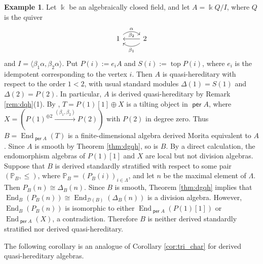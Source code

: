\documentclass[a4paper,reqno,11pt]{amsart}
\numberwithin{equation}{section}
\theoremstyle{definition}
\newtheorem{example}[theorem]{Example}
\newcommand{\D}{\mathcal{D}}
\newcommand{\PP}{\mathbb{P}}
\newcommand{\bde}{\Delta}
\newcommand{\kk}{\Bbbk}
\DeclareMathOperator{\per}{\mathsf{per}}
\DeclareMathOperator{\End}{End}
\begin{document}
\begin{example}\label{ex:rickard}
Let $\kk$ be an algebraically closed field, and let $A=\kk Q/I$, where $Q$ is the quiver
\[
\begin{tikzcd}
1 \arrow[r, bend left=40, "\alpha"] & 2 \arrow[l, bend left=40, "\beta_{1}"] \arrow[l, "\beta_{2}"']
\end{tikzcd}
\]
and $I=\langle\beta_{1}\alpha,\beta_{2}\alpha\rangle$.
Put $P(i):=e_{i}A$ and $S(i):=\operatorname{top}P(i)$, where $e_{i}$ is the idempotent corresponding to the vertex $i$.
Then $A$ is quasi-hereditary with respect to the order $1<2$, with usual standard modules $\Delta(1)=S(1)$ and $\Delta(2)=P(2)$.
In particular, $A$ is derived quasi-hereditary by Remark \ref{rem:dqh}(1).
By \cite{R19}, $T=P(1)[1]\oplus X$ is a tilting object in $\per A$, where $X=(P(1)^{\oplus2}\xrightarrow{(\beta_{1},\beta_{2})}P(2))$ with $P(2)$ in degree zero.
Thus $B=\End_{\per A}(T)$ is a finite-dimensional algebra derived Morita equivalent to $A$.
Since $A$ is smooth by Theorem \ref{thm:dgqh}, so is $B$.
By a direct calculation, the endomorphism algebras of $P(1)[1]$ and $X$ are local but not division algebras.
Suppose that $B$ is derived standardly stratified with respect to some pair $(\PP_{B},\leq)$, where $\PP_{B}=(P_{B}(i))_{i\in\Lambda}$, and let $n$ be the maximal element of $\Lambda$.
Then $P_{B}(n)\cong\bde_{B}(n)$.
Since $B$ is smooth, Theorem \ref{thm:dgqh} implies that $\End_{B}(P_{B}(n))\cong\End_{\D(B)}(\bde_{B}(n))$ is a division algebra.
However, $\End_{B}(P_{B}(n))$ is isomorphic to either $\End_{\per A}(P(1)[1])$ or $\End_{\per A}(X)$, a contradiction.
Therefore $B$ is neither derived standardly stratified nor derived quasi-hereditary.
\end{example}

The following corollary is an analogue of Corollary \ref{cor:tri_char} for derived quasi-hereditary algebras.
\end{document}
